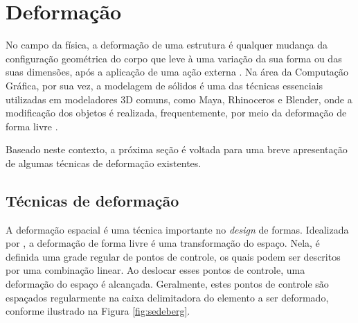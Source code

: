 \section{Deformação}
\label{sec:deformacao}

No campo da física, a deformação de uma estrutura é qualquer mudança da configuração geométrica do corpo que leve à uma variação da sua forma ou das suas dimensões, após a aplicação de uma ação externa \cite{truesdell1992}. Na área da Computação Gráfica, por sua vez, a modelagem de sólidos é uma das técnicas essenciais utilizadas em modeladores 3D comuns, como Maya, Rhinoceros e Blender, onde a modificação dos objetos é realizada, frequentemente, por meio da deformação de forma livre \cite{jana2017}.

Baseado neste contexto, a próxima seção é voltada para uma breve apresentação de algumas técnicas de deformação existentes. 

\subsection{Técnicas de deformação}
\label{sec:tecnicas_deformacao}

A deformação espacial é uma técnica importante no \textit{design} de formas. Idealizada por , a deformação de forma livre é uma transformação do espaço. Nela, é definida uma grade regular de pontos de controle, os quais podem ser descritos por uma combinação linear. Ao deslocar esses pontos de controle, uma deformação do espaço é alcançada. Geralmente, estes pontos de controle são espaçados regularmente na caixa delimitadora do elemento a ser deformado, conforme ilustrado na Figura \ref{fig:sedeberg}.

\begin{figure}[h!]
	\centering
	\captionsetup{width=15cm}
	{}	
\end{figure}

